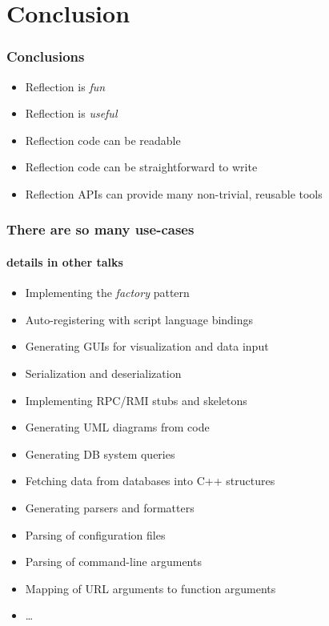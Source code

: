 \documentclass[aspectratio=169,compress,table,xcolor=table]{beamer}
\begin{document}
\section{Conclusion}
\begin{frame}
  \frametitle{Conclusions}
  \larger
  \begin{itemize}
    \item Reflection is {\em \larger fun}
    \item Reflection is {\em \larger useful}
    \item Reflection code can be readable
    \item Reflection code can be straightforward to write
    \item Reflection APIs can provide many non-trivial, reusable tools
  \end{itemize}
\end{frame}
\begin{frame}
  \frametitle{There are so many use-cases}
  \framesubtitle{details in other talks}
  \begin{itemize}
    \item Implementing the {\em factory} pattern
    \item Auto-registering with script language bindings
    \item Generating GUIs for visualization and data input
    \item Serialization and deserialization
    \item Implementing RPC/RMI stubs and skeletons
    \item Generating UML diagrams from code
    \item Generating DB system queries
    \item Fetching data from databases into C++ structures
    \item Generating  parsers and formatters
    \item Parsing of configuration files
    \item Parsing of command-line arguments
    \item Mapping of URL arguments to function arguments
    \item \ldots
  \end{itemize}
\end{frame}
\end{document}
